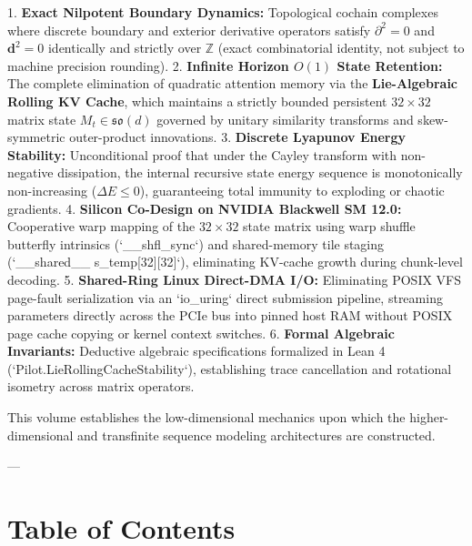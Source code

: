\documentclass[11pt,twoside,openright]{amsbook}
\begin{document}
1. \textbf{Exact Nilpotent Boundary Dynamics:} Topological cochain complexes where discrete boundary and exterior derivative operators satisfy $\partial^2 = 0$ and $\mathbf{d}^2 = 0$ identically and strictly over $\mathbb{Z}$ (exact combinatorial identity, not subject to machine precision rounding).
2. \textbf{Infinite Horizon $O(1)$ State Retention:} The complete elimination of quadratic attention memory via the \textbf{Lie-Algebraic Rolling KV Cache}, which maintains a strictly bounded persistent $32 \times 32$ matrix state $M_t \in \mathfrak{so}(d)$ governed by unitary similarity transforms and skew-symmetric outer-product innovations.
3. \textbf{Discrete Lyapunov Energy Stability:} Unconditional proof that under the Cayley transform with non-negative dissipation, the internal recursive state energy sequence is monotonically non-increasing ($\Delta E \le 0$), guaranteeing total immunity to exploding or chaotic gradients.
4. \textbf{Silicon Co-Design on NVIDIA Blackwell SM 12.0:} Cooperative warp mapping of the $32 \times 32$ state matrix using warp shuffle butterfly intrinsics (`__shfl_sync`) and shared-memory tile staging (`__shared__ s_temp[32][32]`), eliminating KV-cache growth during chunk-level decoding.
5. \textbf{Shared-Ring Linux Direct-DMA I/O:} Eliminating POSIX VFS page-fault serialization via an `io_uring` direct submission pipeline, streaming parameters directly across the PCIe bus into pinned host RAM without POSIX page cache copying or kernel context switches.
6. \textbf{Formal Algebraic Invariants:} Deductive algebraic specifications formalized in Lean 4 (`Pilot.LieRollingCacheStability`), establishing trace cancellation and rotational isometry across matrix operators.

This volume establishes the low-dimensional mechanics upon which the higher-dimensional and transfinite sequence modeling architectures are constructed.


---


\section{Table of Contents}
\end{document}
